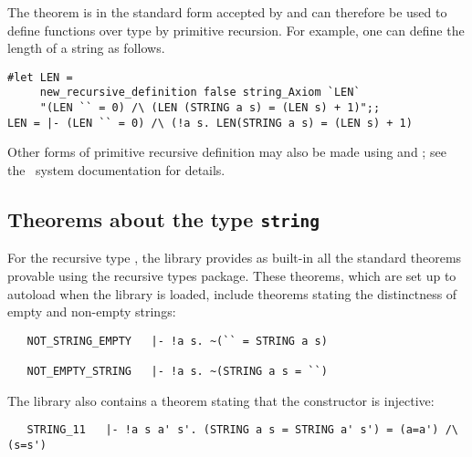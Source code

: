 The theorem  is in the standard form accepted by
 and can therefore be used to define functions
over type  by primitive recursion.  For example, one can define the
length of a string as follows.

\setcounter{sessioncount}{1}
\begin{session}\begin{verbatim}
#let LEN = 
     new_recursive_definition false string_Axiom `LEN` 
     "(LEN `` = 0) /\ (LEN (STRING a s) = (LEN s) + 1)";;
LEN = |- (LEN `` = 0) /\ (!a s. LEN(STRING a s) = (LEN s) + 1)
\end{verbatim}\end{session}

\noindent Other forms of primitive recursive definition may also be made using
 and ; see the \HOL\ system
documentation for details.%

\subsection{Theorems about the type {\tt string}}%

For the recursive type , the library provides as built-in all the
standard theorems provable using the recursive types package.  These theorems,
which are set up to autoload when the library is loaded, include theorems
stating the distinctness of empty and non-empty strings:

\begin{hol}
\begin{verbatim}
   NOT_STRING_EMPTY   |- !a s. ~(`` = STRING a s)

   NOT_EMPTY_STRING   |- !a s. ~(STRING a s = ``)
\end{verbatim}\end{hol}

\noindent The library also contains a theorem stating that the constructor
 is injective:

\begin{hol}
\begin{verbatim}
   STRING_11   |- !a s a' s'. (STRING a s = STRING a' s') = (a=a') /\ (s=s')
\end{verbatim}\end{hol}


